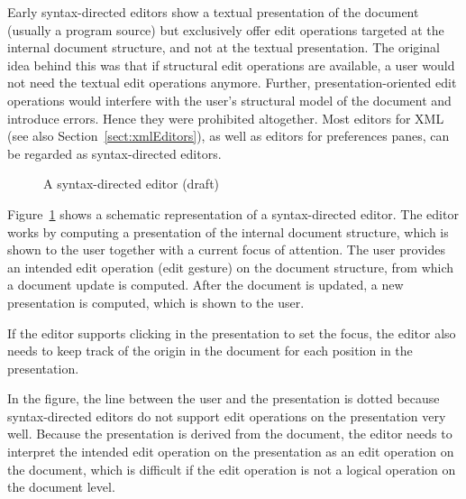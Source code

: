 Early syntax-directed editors show a textual presentation of the document (usually a program source) but exclusively offer edit operations targeted at the internal document structure, and not at the textual presentation. The original idea behind this was that if structural edit operations are available, a user would not need the textual edit operations anymore. Further, presentation-oriented edit operations would interfere with the user's structural model of the document and introduce errors. Hence they were prohibited altogether. Most editors for XML (see also Section~\ref{sect:xmlEditors}), as well as editors for preferences panes, can be regarded as syntax-directed editors.

\begin{figure}
\begin{small}
\begin{center}
\begin{center}
\begin{small}
\noindent {}
\end{small}
\end{center}\caption{A syntax-directed editor (draft)}\label{synDirEdit} 
\end{center}
\end{small}
\end{figure}


Figure~\ref{synDirEdit} shows a schematic representation of a syntax-directed editor. The editor works by computing a presentation of the internal document structure, which is shown to the user together with a current focus of attention. The user provides an intended edit operation (edit gesture) on the document structure, from which a document update is computed. After the document is updated, a new presentation is computed, which is shown to the user.

If the editor supports clicking in the presentation to set the focus, the editor also needs to keep track of the origin in the document for each position in the presentation.

In the figure, the line between the user and the presentation is dotted because syntax-directed editors do not support edit operations on the presentation very well. Because the presentation is derived from the document, the editor needs to interpret the intended edit operation on the presentation as an edit operation on the document, which is difficult if the edit operation is not a logical operation on the document level.

